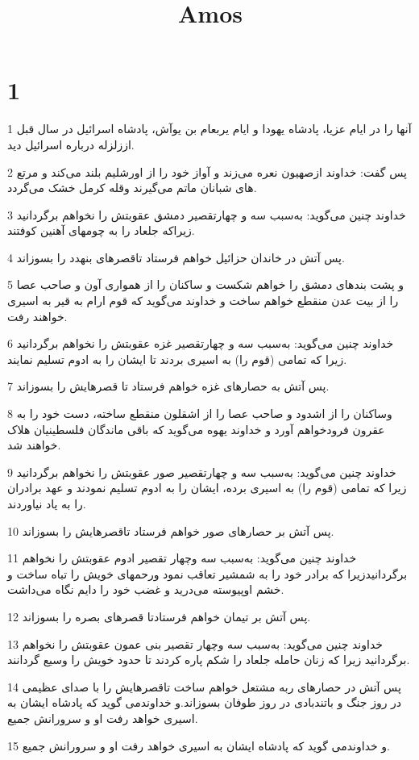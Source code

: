 

\title{Amos}


\chapter{1}

\par 1 آنها را در ایام عزیا، پادشاه یهودا و ایام یربعام بن یوآش، پادشاه اسرائیل در سال قبل اززلزله درباره اسرائیل دید.
\par 2 پس گفت: خداوند ازصهیون نعره می‌زند و آواز خود را از اورشلیم بلند می‌کند و مرتع های شبانان ماتم می‌گیرند وقله کرمل خشک می‌گردد.
\par 3 خداوند چنین می‌گوید: به‌سبب سه و چهارتقصیر دمشق عقوبتش را نخواهم برگردانید زیراکه جلعاد را به چومهای آهنین کوفتند.
\par 4 پس آتش در خاندان حزائیل خواهم فرستاد تاقصرهای بنهدد را بسوزاند.
\par 5 و پشت بندهای دمشق را خواهم شکست و ساکنان را از همواری آون و صاحب عصا را از بیت عدن منقطع خواهم ساخت و خداوند می‌گوید که قوم ارام به قیر به اسیری خواهند رفت.
\par 6 خداوند چنین می‌گوید: به‌سبب سه و چهارتقصیر غزه عقوبتش را نخواهم برگردانید زیرا که تمامی (قوم را) به اسیری بردند تا ایشان را به ادوم تسلیم نمایند.
\par 7 پس آتش به حصارهای غزه خواهم فرستاد تا قصرهایش را بسوزاند.
\par 8 وساکنان را از اشدود و صاحب عصا را از اشقلون منقطع ساخته، دست خود را به عقرون فرودخواهم آورد و خداوند یهوه می‌گوید که باقی ماندگان فلسطینیان هلاک خواهند شد.
\par 9 خداوند چنین می‌گوید: به‌سبب سه و چهارتقصیر صور عقوبتش را نخواهم برگردانید زیرا که تمامی (قوم را) به اسیری برده، ایشان را به ادوم تسلیم نمودند و عهد برادران را به یاد نیاوردند.
\par 10 پس آتش بر حصارهای صور خواهم فرستاد تاقصرهایش را بسوزاند.
\par 11 خداوند چنین می‌گوید: به‌سبب سه وچهار تقصیر ادوم عقوبتش را نخواهم برگردانیدزیرا که برادر خود را به شمشیر تعاقب نمود ورحمهای خویش را تباه ساخت و خشم اوپیوسته می‌درید و غضب خود را دایم نگاه می‌داشت.
\par 12 پس آتش بر تیمان خواهم فرستادتا قصرهای بصره را بسوزاند.
\par 13 خداوند چنین می‌گوید: به‌سبب سه وچهار تقصیر بنی عمون عقوبتش را نخواهم برگردانید زیرا که زنان حامله جلعاد را شکم پاره کردند تا حدود خویش را وسیع گردانند.
\par 14 پس آتش در حصارهای ربه مشتعل خواهم ساخت تاقصرهایش را با صدای عظیمی در روز جنگ و باتندبادی در روز طوفان بسوزاند.و خداوندمی گوید که پادشاه ایشان به اسیری خواهد رفت او و سرورانش جمیع.
\par 15 و خداوندمی گوید که پادشاه ایشان به اسیری خواهد رفت او و سرورانش جمیع.

